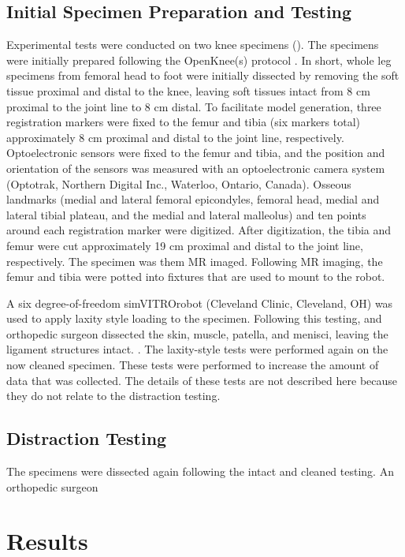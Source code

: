 \subsection{Initial Specimen Preparation and Testing}
Experimental tests were conducted on two knee specimens (). The specimens were initially prepared following the OpenKnee(s) protocol \citep{erdemir_open_2016}. In short, whole leg specimens from femoral head to foot were initially dissected by removing the soft tissue proximal and distal to the knee, leaving soft tissues intact from 8 cm proximal to the joint line to 8 cm distal. To facilitate model generation, three registration markers were fixed to the femur and tibia (six markers total) approximately 8 cm proximal and distal to the joint line, respectively. Optoelectronic sensors were fixed to the femur and tibia, and the position and orientation of the sensors was measured with an optoelectronic camera system (Optotrak, Northern Digital Inc., Waterloo, Ontario, Canada). Osseous landmarks (medial and lateral femoral epicondyles, femoral head, medial and lateral tibial plateau, and the medial and lateral malleolus) and ten points around each registration marker were digitized. After digitization, the tibia and femur were cut approximately 19 cm proximal and distal to the joint line, respectively. The specimen was them MR imaged. Following MR imaging, the femur and tibia were potted into fixtures that are used to mount to the robot.

A six degree-of-freedom simVITRO\texttrademark robot (Cleveland Clinic, Cleveland, OH) was used to apply laxity style loading to the specimen. Following this testing, and orthopedic surgeon dissected the skin, muscle, patella, and menisci, leaving the ligament structures intact. . The laxity-style tests were performed again on the now cleaned specimen. These tests were performed to increase the amount of data that was collected. The details of these tests are not described here because they do not relate to the distraction testing.

\subsection{Distraction Testing}
The specimens were dissected again following the intact and cleaned testing. An orthopedic surgeon 

\section{Results}
